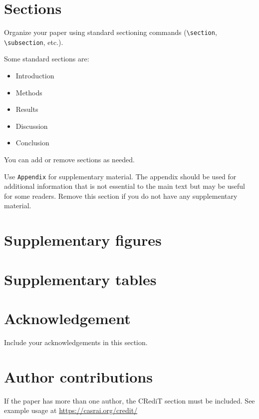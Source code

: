 \section{Sections}

Organize your paper using standard sectioning commands (\verb|\section|, \verb|\subsection|, etc.).

Some standard sections are:

\begin{itemize}
  \item Introduction
  \item Methods
  \item Results
  \item Discussion
  \item Conclusion
\end{itemize}

You can add or remove sections as needed.

Use \verb|Appendix| for supplementary material. The appendix should be used for additional information that is not essential to the main text but may be useful for some readers. Remove this section if you do not have any supplementary material.

\appendix

\section{Supplementary figures}

\section{Supplementary tables}


\section*{Acknowledgement}
Include your acknowledgements in this section.

\section*{Author contributions}
If the paper has more than one author, the CRediT section must be included. See example usage at \url{https://casrai.org/credit/}

